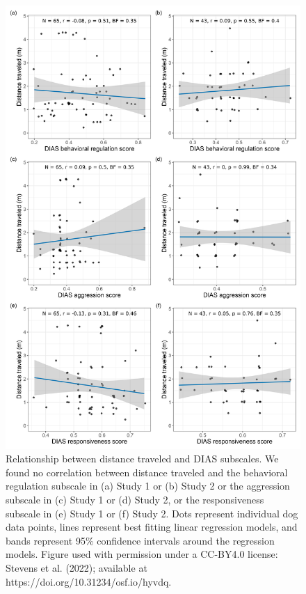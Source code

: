 \documentclass[
  doc]{apa6}
\begin{document}
\clearpage

\begin{figure}

{\centering \includegraphics[width=0.75\linewidth]{figures/distance_dias_subscales} 

}

\caption{Relationship between distance traveled and DIAS subscales. We found no correlation between distance traveled and the behavioral regulation subscale in (a) Study 1 or (b) Study 2 or the aggression subscale in (c) Study 1 or (d) Study 2, or the responsiveness subscale in (e) Study 1 or (f) Study 2. Dots represent individual dog data points, lines represent best fitting linear regression models, and bands represent 95\% confidence intervals around the regression models.  Figure used with permission under a CC-BY4.0 license: Stevens et al. (2022); available at https://doi.org/10.31234/osf.io/hyvdq.}\label{fig:dias-all}
\end{figure}
\end{document}
